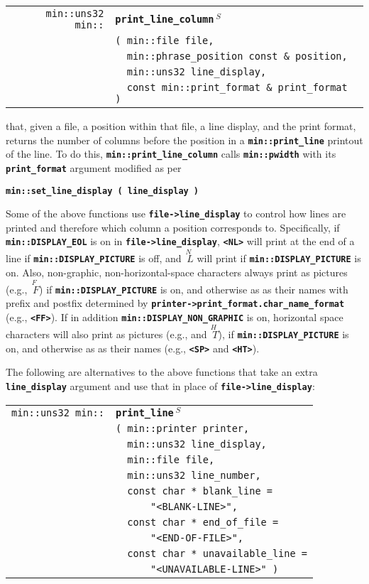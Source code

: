 \documentclass[12pt]{article}
\makeatletter
\newcommand{\TT}[1]{{\tt \bfseries #1}}
\newcommand{\ttindex}[1]{\index{#1@{\tt #1}}}
\newcommand{\EOL}{\penalty \exhyphenpenalty}
\newenvironment{indpar}[1][0.3in]%
	{\begin{list}{}%
		     {\setlength{\itemsep}{0in}%
		      \setlength{\topsep}{0in}%
		      \setlength{\parsep}{1ex}%
		      \setlength{\labelwidth}{#1}%
		      \setlength{\leftmargin}{#1}%
		      \addtolength{\leftmargin}{\labelsep}}%
	 \item}%
	{\end{list}}
\newcommand{\LABEL}[1]{\label{#1}}
\newlength{\ARGBREAKLENGTH}
\newcommand{\ARGBREAK}[1][\ARGBREAKLENGTH]{\\&\hspace*{#1}}
\newcommand{\MINKEY}[1]%
	   {\TT{#1}\ttindex{min::#1}\ttindex{#1}}
\newcommand{\RESIZE}{$\,^S$}
\makeatother
\begin{document}
\begin{indpar}[1em]\begin{tabular}{r@{}l}
\verb|min::uns32 min::|
    & \MINKEY{print\_\EOL line\_\EOL column\RESIZE}\ARGBREAK
      \verb|( min::file file,|\ARGBREAK
      \verb|  min::phrase_position const & position,|\ARGBREAK
      \verb|  min::uns32 line_display,|\ARGBREAK
      \verb|  const min::print_format & print_format )|
\LABEL{MIN::PRINT_LINE_COLUMN} \\
\end{tabular}\end{indpar}

that, given a file, a position within that file, a line display,
and the print format, returns the number of
columns before the position in a \TT{min::\EOL print\_\EOL line}
printout of the line.  To do this, \TT{min::\EOL print\_\EOL line\_\EOL column}
calls \TT{min::\EOL pwidth} with its \TT{print\_\EOL format} argument modified
as per
\begin{center}
\TT{min::set\_line\_display ( line\_display )}
\end{center}

Some of the above functions use \TT{file->line\_display}
to control how lines are printed and therefore which column
a position corresponds to.  Specifically, if \TT{min::\EOL DISPLAY\_\EOL EOL}
is on in \TT{file->line\_display}, \TT{<NL>} 
will print at the end of a line if
\TT{min::\EOL DISPLAY\_\EOL PICTURE} is off, and
{\tiny $\stackrel{\textstyle N~}{~L}$} will print if
\TT{min::\EOL DISPLAY\_\EOL PICTURE} is on.  Also,
non-graphic, non-horizontal-space characters always print as pictures
(e.g., {\tiny $\stackrel{\textstyle F~}{~F}$})
if \TT{min::\EOL DISPLAY\_\EOL PICTURE} is on, and otherwise as
as their names with prefix and postfix determined by
\TT{printer->\EOL print\_\EOL format.char\_\EOL name\_\EOL format}
(e.g., \TT{<FF>}).
If in addition \TT{min::\EOL DISPLAY\_\EOL NON\_\EOL GRAPHIC} is on,
horizontal space characters will also print as pictures
(e.g., \TT{\textvisiblespace} and {\tiny $\stackrel{\textstyle H~}{~T}$}),
if \TT{min::\EOL DISPLAY\_\EOL PICTURE} is on, and otherwise as
as their names (e.g., \TT{<SP>} and \TT{<HT>}).

The following are alternatives to the above functions that take
an extra \TT{line\_\EOL display} argument and use that in place of
\TT{file->\EOL line\_\EOL display}:

\begin{indpar}[1em]\begin{tabular}{r@{}l}
\verb|min::uns32 min::|
    & \MINKEY{print\_\EOL line\RESIZE}\ARGBREAK
      \verb|( min::printer printer,|\ARGBREAK
      \verb|  min::uns32 line_display,|\ARGBREAK
      \verb|  min::file file,|\ARGBREAK
      \verb|  min::uns32 line_number,|\ARGBREAK
      \verb|  const char * blank_line =|\ARGBREAK
      \verb|      "<BLANK-LINE>",|\ARGBREAK
      \verb|  const char * end_of_file =|\ARGBREAK
      \verb|      "<END-OF-FILE>",|\ARGBREAK
      \verb|  const char * unavailable_line =|\ARGBREAK
      \verb|      "<UNAVAILABLE-LINE>" )|
\LABEL{MIN::PRINT_LINE_WITH_FLAGS} \\
\end{tabular}\end{indpar}
\end{document}
